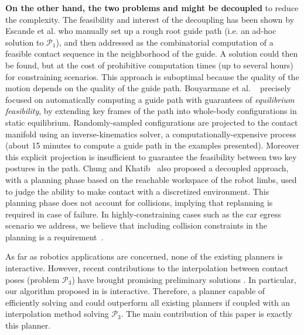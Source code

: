 \textbf{On the other hand, the two problems \Pa and \Pb might be decoupled} to reduce the complexity. The feasibility and interest of the decoupling has been shown by Escande et al. \cite{DBLP:conf/iser/EscandeKMG08} who manually set up a rough root guide path (i.e. an ad-hoc solution to $\mathcal{P}_1$), and then addressed \Pb as the combinatorial computation of a feasible contact sequence in the neighborhood of the guide. A solution could then be found, %
but at the cost of prohibitive computation times (up to several hours) for constraining scenarios. This approach is suboptimal because the quality of the motion depends on the quality of the guide path. Bouyarmane et al. ~\cite{Bouyarmane2009} precisely focused on automatically computing a guide path with guarantees of \textit{equilibrium feasibility}, by extending key frames of the path into whole-body configurations in static equilibrium. Randomly-sampled configurations are projected to the contact manifold using an inverse-kinematics solver, a computationally-expensive process (about 15 minutes to compute a guide path in the examples presented). Moreover this explicit projection is insufficient to guarantee the feasibility between two key postures in the path. Chung and Khatib~\cite{7140082} also proposed a decoupled approach, with a planning phase based on the reachable workspace of the robot limbs, used to judge the ability to make contact with a discretized environment. This planning phase does not account for collisions, implying that replanning is required in case of failure. In highly-constraining cases such as the car egress scenario we address, we believe that including collision constraints in the planning is a requirement~\citep{tonneauisrr15,grey2017footstep}.


As far as robotics applications are concerned, none of the existing planners is \gls{interactive}.
However, recent contributions to the interpolation between contact poses (problem $\mathcal{P}_3$) have brought promising preliminary solutions \citep{Hauser2014, herzog2015trajectory, Park116, Carpentier2016}. In particular, our algorithm proposed in \cite{Carpentier2016} is \gls{interactive}.
Therefore, a planner capable of efficiently solving \Pa and \Pb could outperform all existing planners if coupled with an interpolation method solving $\mathcal{P}_3$.
The main contribution of this paper is exactly this planner.

